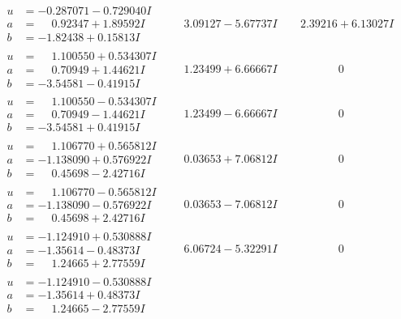 \documentclass[1p]{elsarticle_modified}
\theoremstyle{definition}
\begin{document}
$$\begin{array}{c|c|c}
\begin{aligned}
u &= -0.287071 - 0.729040 I \\
a &= \phantom{-}0.92347 + 1.89592 I \\
b &= -1.82438 + 0.15813 I\end{aligned}
 & \phantom{-}3.09127 - 5.67737 I & \phantom{-}2.39216 + 6.13027 I \\ \hline\begin{aligned}
u &= \phantom{-}1.100550 + 0.534307 I \\
a &= \phantom{-}0.70949 + 1.44621 I \\
b &= -3.54581 - 0.41915 I\end{aligned}
 & \phantom{-}1.23499 + 6.66667 I & \phantom{-0.000000 } 0 \\ \hline\begin{aligned}
u &= \phantom{-}1.100550 - 0.534307 I \\
a &= \phantom{-}0.70949 - 1.44621 I \\
b &= -3.54581 + 0.41915 I\end{aligned}
 & \phantom{-}1.23499 - 6.66667 I & \phantom{-0.000000 } 0 \\ \hline\begin{aligned}
u &= \phantom{-}1.106770 + 0.565812 I \\
a &= -1.138090 + 0.576922 I \\
b &= \phantom{-}0.45698 - 2.42716 I\end{aligned}
 & \phantom{-}0.03653 + 7.06812 I & \phantom{-0.000000 } 0 \\ \hline\begin{aligned}
u &= \phantom{-}1.106770 - 0.565812 I \\
a &= -1.138090 - 0.576922 I \\
b &= \phantom{-}0.45698 + 2.42716 I\end{aligned}
 & \phantom{-}0.03653 - 7.06812 I & \phantom{-0.000000 } 0 \\ \hline\begin{aligned}
u &= -1.124910 + 0.530888 I \\
a &= -1.35614 - 0.48373 I \\
b &= \phantom{-}1.24665 + 2.77559 I\end{aligned}
 & \phantom{-}6.06724 - 5.32291 I & \phantom{-0.000000 } 0 \\ \hline\begin{aligned}
u &= -1.124910 - 0.530888 I \\
a &= -1.35614 + 0.48373 I \\
b &= \phantom{-}1.24665 - 2.77559 I\end{aligned}

\end{array}$$
\end{document}
